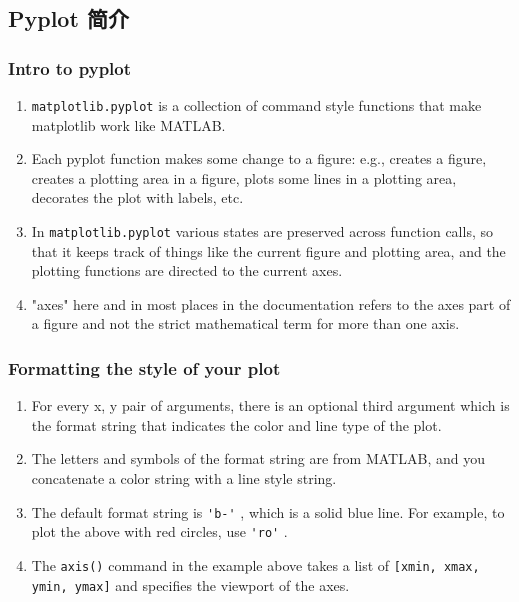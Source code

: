 \documentclass[UTF8,a4paper,12pt]{ctexart}  %
\providecommand{\tightlist}{\setlength{\itemsep}{0pt}\setlength{\parskip}{0pt}}
\newcommand{\passthrough}[1]{\lstset{mathescape=false}#1\lstset{mathescape=true}}
\begin{document}
\hypertarget{pyplot-ux7b80ux4ecb}{%
\subsection{Pyplot 简介}\label{pyplot-ux7b80ux4ecb}}

\hypertarget{intro-to-pyplot}{%
\subsubsection{Intro to pyplot}\label{intro-to-pyplot}}

\begin{enumerate}
\def\labelenumi{\arabic{enumi}.}
\tightlist
\item
  \passthrough{\lstinline!matplotlib.pyplot!} is a collection of command style functions that
  make matplotlib work like MATLAB.
\item
  Each pyplot function makes some change to a figure: e.g., creates a
  figure, creates a plotting area in a figure, plots some lines in a
  plotting area, decorates the plot with labels, etc.
\item
  In \passthrough{\lstinline!matplotlib.pyplot!} various states are preserved across function
  calls, so that it keeps track of things like the current figure and
  plotting area, and the plotting functions are directed to the
  current axes.
\item
  "axes" here and in most places in the documentation refers to the
  axes part of a figure and not the strict mathematical term for more
  than one axis.
\end{enumerate}

\hypertarget{formatting-the-style-of-your-plot}{%
\subsubsection{Formatting the style of your plot}\label{formatting-the-style-of-your-plot}}

\begin{enumerate}
\def\labelenumi{\arabic{enumi}.}
\tightlist
\item
  For every x, y pair of arguments, there is an optional third
  argument which is the format string that indicates the color and
  line type of the plot.
\item
  The letters and symbols of the format string are from MATLAB, and
  you concatenate a color string with a line style string.
\item
  The default format string is \passthrough{\lstinline!'b-'!} , which is a solid blue line.
  For example, to plot the above with red circles, use \passthrough{\lstinline!'ro'!} .
\item
  The \passthrough{\lstinline!axis()!} command in the example above takes a list of
  \passthrough{\lstinline![xmin, xmax, ymin, ymax]!} and specifies the viewport of the axes.
\end{enumerate}
\end{document}
